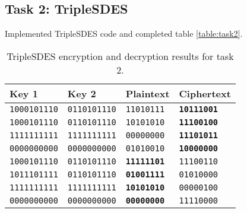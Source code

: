 \documentclass[a4paper,english,12pt]{article}
\begin{document}
\subsection{Task 2: TripleSDES}

Implemented TripleSDES code and completed table \vref{table:task2}.

\begin{table}
  \centering
  \begin{tabular}{@{}llll@{}}
    \toprule
      Key 1 &
      Key 2 &
      Plaintext &
      Ciphertext \\
    \midrule

             \texttt{1000101110} &
             \texttt{0110101110} &
               \texttt{11010111} &
       \texttt{\textbf{10111001}} \\

            \texttt{1000101110} &
            \texttt{0110101110} &
              \texttt{10101010} &
      \texttt{\textbf{11100100}} \\

            \texttt{1111111111} &
            \texttt{1111111111} &
              \texttt{00000000} &
      \texttt{\textbf{11101011}} \\

            \texttt{0000000000} &
            \texttt{0000000000} &
              \texttt{01010010} &
      \texttt{\textbf{10000000}} \\

            \texttt{1000101110} &
            \texttt{0110101110} &
      \texttt{\textbf{11111101}} &
              \texttt{11100110} \\

             \texttt{1011101111} &
             \texttt{0110101110} &
       \texttt{\textbf{01001111}} &
               \texttt{01010000} \\

            \texttt{1111111111} &
            \texttt{1111111111} &
      \texttt{\textbf{10101010}} &
              \texttt{00000100} \\

            \texttt{0000000000} &
            \texttt{0000000000} &
      \texttt{\textbf{00000000}} &
              \texttt{11110000} \\
      \bottomrule
  \end{tabular}
  \caption{TripleSDES encryption and decryption results for task 2.}
  \label{table:task2}
\end{table}
\end{document}
